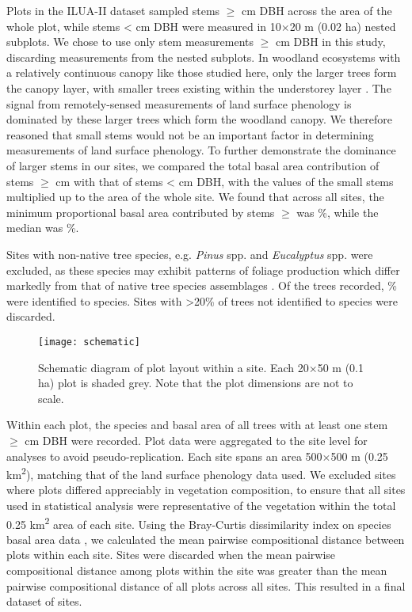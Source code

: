 \documentclass[11pt,a4paper]{article}
\begin{document}
Plots in the ILUA-II dataset sampled stems $\geq$\stemSize{} cm DBH across the
area of the whole plot, while stems <\stemSize{} cm DBH were measured in
10$\times$20 m (0.02 ha) nested subplots. We chose to use only stem
measurements $\geq$\stemSize{} cm DBH in this study, discarding measurements
from the nested subplots. In woodland ecosystems with a relatively continuous
canopy like those studied here, only the larger trees form the canopy layer,
with smaller trees existing within the understorey layer \citep{Chidumayo2001}.
The signal from remotely-sensed measurements of land surface phenology is
dominated by these larger trees which form the woodland canopy. We therefore
reasoned that small stems would not be an important factor in determining
measurements of land surface phenology. To further demonstrate the dominance of
larger stems in our sites, we compared the total basal area contribution of
stems $\geq$\stemSize{} cm with that of stems <\stemSize{} cm DBH, with the
values of the small stems multiplied up to the area of the whole site. We found
that across all sites, the minimum proportional basal area contributed by stems
$\geq$\stemSize{} was \minPropBABig{}\%, while the median was
\medianPropBABig{}\%.

Sites with non-native tree species, e.g. \textit{Pinus} spp. and
\textit{Eucalyptus} spp. were excluded, as these species may exhibit patterns
of foliage production which differ markedly from that of native tree species
assemblages \citep{Broadhead2003}. Of the \nTrees{} trees recorded,
\perSpID{}\% were identified to species. Sites with >20\% of trees not
identified to species were discarded.

\begin{figure}[H]
\centering
	\texttt{[image: schematic]}
	\caption{Schematic diagram of plot layout within a site. Each 20$\times$50
		m (0.1 ha) plot is shaded grey. Note that the plot dimensions are not to
		scale.}
	\label{schematic}
\end{figure}

Within each plot, the species and basal area of all trees with at least one
stem $\geq$\stemSize{} cm DBH were recorded. Plot data were aggregated to the
site level for analyses to avoid pseudo-replication. Each site spans an area
500$\times$500 m (0.25 km\textsuperscript{2}), matching that of the land
surface phenology data used. We excluded sites where plots differed appreciably
in vegetation composition, to ensure that all sites used in statistical
analysis were representative of the vegetation within the total 0.25
km\textsuperscript{2} area of each site. Using the Bray-Curtis dissimilarity
index on species basal area data \citep{Faith1987}, we calculated the mean
pairwise compositional distance between plots within each site. Sites were
discarded when the mean pairwise compositional distance among plots within the
site was greater than the mean pairwise compositional distance of all plots
across all sites. This resulted in a final dataset of \plotDistN{} sites.
\end{document}
